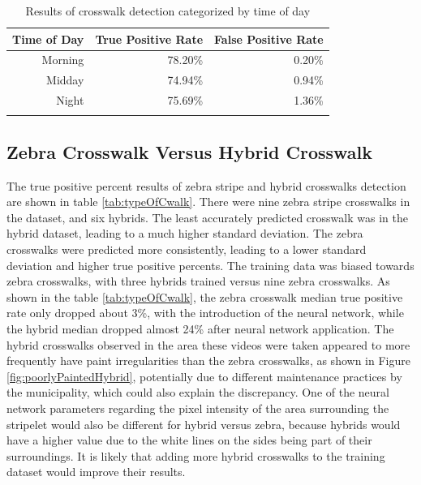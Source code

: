 \documentclass[12pt]{ucthesis}
\begin{document}
\begin{table}[t]
    \begin{longtable}{|r|r|r|}
    \hline
    Time of Day & True Positive Rate & False Positive Rate \bigstrut\\
    \hline
    Morning & 78.20\% & 0.20\% \bigstrut\\
    \hline
    Midday & 74.94\% & 0.94\% \bigstrut\\
    \hline
    Night & 75.69\% & 1.36\% \bigstrut\\
    \hline


    \caption{Results of crosswalk detection categorized by time of day}
    \label{tab:timeofday} 
    \end{longtable}
\end{table}

\subsection{Zebra Crosswalk Versus Hybrid Crosswalk}

The true positive percent results of zebra stripe and hybrid crosswalks detection are shown in table \ref{tab:typeOfCwalk}. There were nine zebra stripe crosswalks in the dataset, and six hybrids. The least accurately predicted crosswalk was in the hybrid dataset, leading to a much higher standard deviation. The zebra crosswalks were predicted more consistently, leading to a lower standard deviation and higher true positive percents. The training data was biased towards zebra crosswalks, with three hybrids trained versus nine zebra crosswalks. As shown in the table \ref{tab:typeOfCwalk}, the zebra crosswalk median true positive rate only dropped about 3\%, with the introduction of the neural network, while the hybrid median dropped almost 24\% after neural network application. The hybrid crosswalks observed in the area these videos were taken appeared to more frequently have paint irregularities than the zebra crosswalks, as shown in Figure \ref{fig:poorlyPaintedHybrid}, potentially due to different maintenance practices by the municipality, which could also explain the discrepancy. One of the neural network parameters regarding the pixel intensity of the area surrounding the stripelet would also be different for hybrid versus zebra, because hybrids would have a higher value due to the white lines on the sides being part of their surroundings. It is likely that adding more hybrid crosswalks to the training dataset would improve their results.
\end{document}
